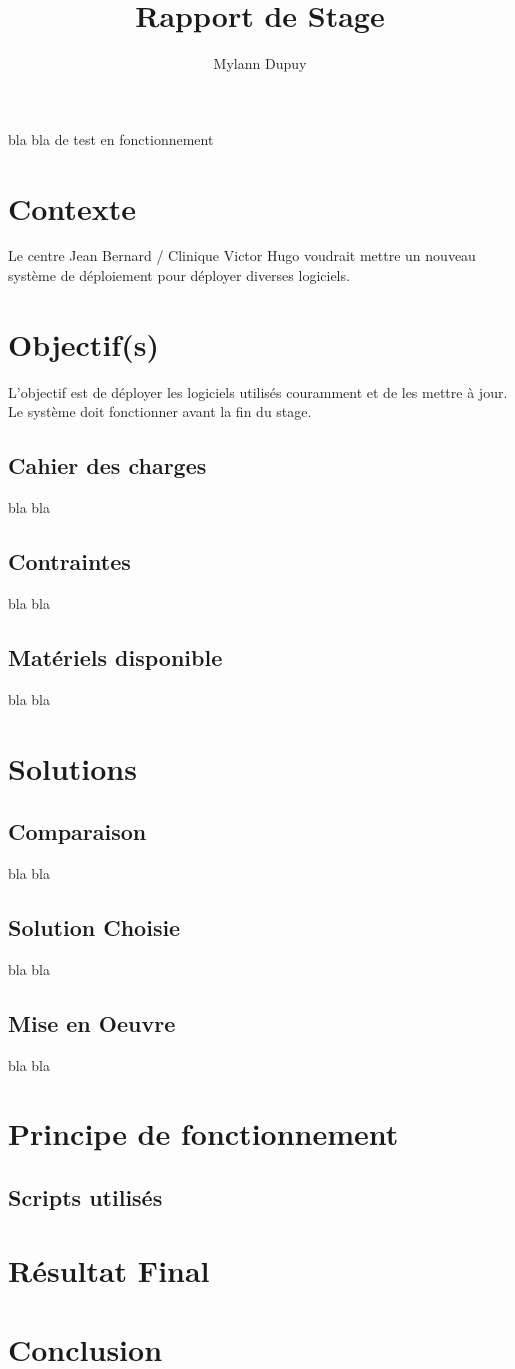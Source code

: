 \documentclass[11pt,a4paper,oneside]{article}
\author{Mylann Dupuy}
\title{Rapport de Stage}
\begin{document}
bla bla de test en fonctionnement
\newpage
\tableofcontents
\newpage
\section{Contexte}
Le centre Jean Bernard / Clinique Victor Hugo voudrait mettre un nouveau système de déploiement pour déployer diverses logiciels.
\section{Objectif(s)}
L'objectif est de déployer les logiciels utilisés couramment et de les mettre à jour. Le système doit fonctionner avant la fin du stage. 
\subsection{Cahier des charges}
bla bla
\\
\subsection{Contraintes}
bla bla
\\
\subsection{Matériels disponible}
bla bla
\\
\section{Solutions}
\subsection{Comparaison}
bla bla
\\
\subsection{Solution Choisie}
bla bla
\\
\subsection{Mise en Oeuvre}
bla bla
\\
\section{Principe de fonctionnement}
\subsection{Scripts utilisés}
\section{Résultat Final}
\section{Conclusion}
\end{document}
